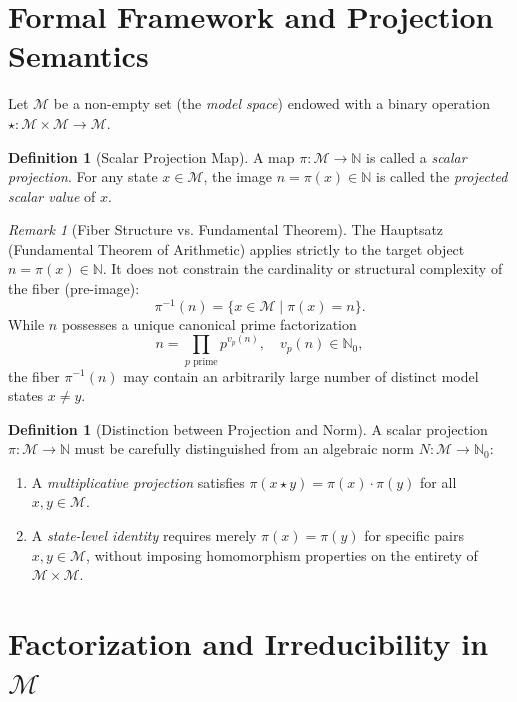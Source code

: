 \documentclass[11pt,a4paper,reqno]{amsart}
\theoremstyle{definition}
\newtheorem{definition}[theorem]{Definition}
\theoremstyle{remark}
\newtheorem{remark}[theorem]{Remark}
\newcommand{\M}{\mathcal{M}}
\newcommand{\N}{\mathbb{N}}
\begin{document}
	\section{Formal Framework and Projection Semantics}
	
	Let $\M$ be a non-empty set (the \emph{model space}) endowed with a binary operation $\star: \M \times \M \to \M$.
	
	\begin{definition}[Scalar Projection Map]
		A map $\pi: \M \to \N$ is called a \emph{scalar projection}. For any state $x \in \M$, the image $n = \pi(x) \in \N$ is called the \emph{projected scalar value} of $x$.
	\end{definition}
	
	\begin{remark}[Fiber Structure vs. Fundamental Theorem]
		The Hauptsatz (Fundamental Theorem of Arithmetic) applies strictly to the target object $n = \pi(x) \in \N$. It does not constrain the cardinality or structural complexity of the fiber (pre-image):
		\begin{equation}
			\pi^{-1}(n) = \{ x \in \M \mid \pi(x) = n \}.
		\end{equation}
		While $n$ possesses a unique canonical prime factorization
		\begin{equation}
			n = \prod_{p \text{ prime}} p^{v_p(n)}, \quad v_p(n) \in \mathbb{N}_0,
		\end{equation}
		the fiber $\pi^{-1}(n)$ may contain an arbitrarily large number of distinct model states $x \neq y$.
	\end{remark}
	
	\begin{definition}[Distinction between Projection and Norm]
		A scalar projection $\pi: \M \to \N$ must be carefully distinguished from an algebraic norm $N: \M \to \N_0$:
		\begin{enumerate}
			\item A \emph{multiplicative projection} satisfies $\pi(x \star y) = \pi(x) \cdot \pi(y)$ for all $x, y \in \M$.
			\item A \emph{state-level identity} requires merely $\pi(x) = \pi(y)$ for specific pairs $x, y \in \M$, without imposing homomorphism properties on the entirety of $\M \times \M$.
		\end{enumerate}
	\end{definition}
	
	\section{Factorization and Irreducibility in $\M$}
	
\end{document}
